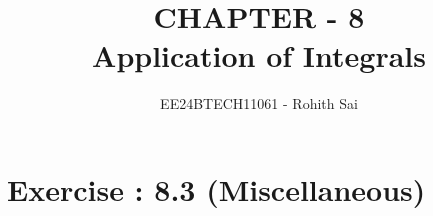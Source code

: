 \documentclass[journal]{IEEEtran}
\begin{document}

\vspace{3cm}

\title{CHAPTER - 8\\Application of Integrals}
\author{EE24BTECH11061 - Rohith Sai}
{\let\newpage\relax\maketitle}

\renewcommand{\thefigure}{\theenumi}
\renewcommand{\thetable}{\theenumi}
\setlength{\intextsep}{10pt} %

\renewcommand{\thetable}{\theenumi}

\section*{Exercise : 8.3 (Miscellaneous)}
\end{document}
